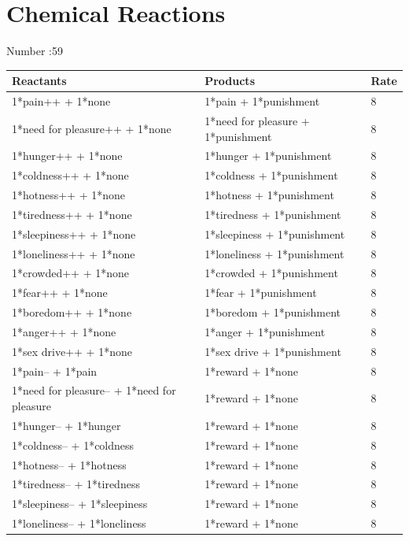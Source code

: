 \documentclass{article}
\begin{document}
\newpage

\section*{Chemical Reactions}

Number :59

\begin{longtable}{|p{7cm}|p{7cm}|p{2cm}|}
\hline
{\bf Reactants} & {\bf Products} & {\bf Rate} \\ \hline
1*pain++ + 1*none & 1*pain + 1*punishment & 8 \\ \hline
1*need for pleasure++ + 1*none & 1*need for pleasure + 1*punishment & 8 \\ \hline
1*hunger++ + 1*none & 1*hunger + 1*punishment & 8 \\ \hline
1*coldness++ + 1*none & 1*coldness + 1*punishment & 8 \\ \hline
1*hotness++ + 1*none & 1*hotness + 1*punishment & 8 \\ \hline
1*tiredness++ + 1*none & 1*tiredness + 1*punishment & 8 \\ \hline
1*sleepiness++ + 1*none & 1*sleepiness + 1*punishment & 8 \\ \hline
1*loneliness++ + 1*none & 1*loneliness + 1*punishment & 8 \\ \hline
1*crowded++ + 1*none & 1*crowded + 1*punishment & 8 \\ \hline
1*fear++ + 1*none & 1*fear + 1*punishment & 8 \\ \hline
1*boredom++ + 1*none & 1*boredom + 1*punishment & 8 \\ \hline
1*anger++ + 1*none & 1*anger + 1*punishment & 8 \\ \hline
1*sex drive++ + 1*none & 1*sex drive + 1*punishment & 8 \\ \hline
1*pain-- + 1*pain & 1*reward + 1*none & 8 \\ \hline
1*need for pleasure-- + 1*need for pleasure & 1*reward + 1*none & 8 \\ \hline
1*hunger-- + 1*hunger & 1*reward + 1*none & 8 \\ \hline
1*coldness-- + 1*coldness & 1*reward + 1*none & 8 \\ \hline
1*hotness-- + 1*hotness & 1*reward + 1*none & 8 \\ \hline
1*tiredness-- + 1*tiredness & 1*reward + 1*none & 8 \\ \hline
1*sleepiness-- + 1*sleepiness & 1*reward + 1*none & 8 \\ \hline
1*loneliness-- + 1*loneliness & 1*reward + 1*none & 8 \\ \hline

\end{longtable}
\end{document}
